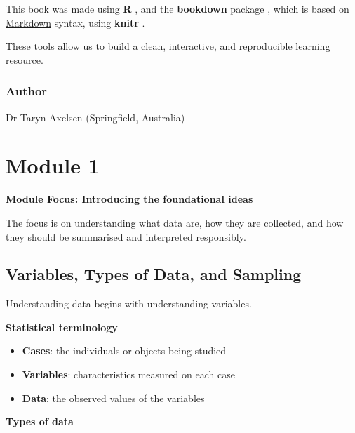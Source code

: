 \documentclass[
  11pt,
  oneside]{scrbook}
\providecommand{\tightlist}{%
  \setlength{\itemsep}{0pt}\setlength{\parskip}{0pt}}
\begin{document}
This book was made using \textbf{R} \citep{R-base}, and the \textbf{bookdown} package \citep{R-bookdown}, which is based on \href{https://en.wikipedia.org/wiki/Markdown}{Markdown} syntax, using \textbf{knitr} \citep{R-knitr}.

These tools allow us to build a clean, interactive, and reproducible learning resource.

\subsection*{Author}\label{author}

Dr Taryn Axelsen (Springfield, Australia)

\mainmatter

\chapter{Module 1}\label{module-1}

\begin{bannerbox}
\textbf{Module Focus: Introducing the foundational ideas}

The focus is on understanding what data are, how they are collected, and how they should be summarised and interpreted responsibly.
\end{bannerbox}

\section{Variables, Types of Data, and Sampling}\label{variables-types-of-data-and-sampling}

Understanding data begins with understanding variables.

\textbf{Statistical terminology}

\begin{itemize}
\tightlist
\item
  \textbf{Cases}: the individuals or objects being studied
\item
  \textbf{Variables}: characteristics measured on each case
\item
  \textbf{Data}: the observed values of the variables
\end{itemize}

\textbf{Types of data}
\end{document}
